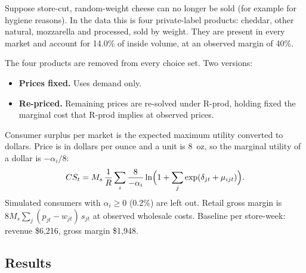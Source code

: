 \documentclass[11pt]{article}
\newcommand{\model}[1]{\textsf{#1}}
\begin{document}
Suppose store-cut, random-weight cheese can no longer be sold (for example for hygiene
reasons). In the data this is four private-label products: cheddar, other natural,
mozzarella and processed, sold by weight. They are present in every market and account for
14.0\% of inside volume, at an observed margin of 40\%.

The four products are removed from every choice set. Two versions:
\begin{itemize}
  \item \textbf{Prices fixed.} Uses demand only.
  \item \textbf{Re-priced.} Remaining prices are re-solved under \model{R-prod}, holding
        fixed the marginal cost that \model{R-prod} implies at observed prices.
\end{itemize}

Consumer surplus per market is the expected maximum utility converted to dollars. Price is
in dollars per ounce and a unit is 8~oz, so the marginal utility of a dollar is
$-\alpha_i / 8$:
\begin{equation}
  CS_t = M_s\, \frac{1}{R} \sum_i \frac{8}{-\alpha_i}
         \ln\Bigl( 1 + \sum_{j} \exp(\delta_{jt} + \mu_{ijt}) \Bigr) .
\end{equation}
Simulated consumers with $\alpha_i \ge 0$ (0.2\%) are left out. Retail gross margin is
$8 M_s \sum_j (p_{jt} - w_{jt})\, s_{jt}$ at observed wholesale costs. Baseline per
store-week: revenue \$6,216, gross margin \$1,948.

\subsection{Results}
\end{document}

